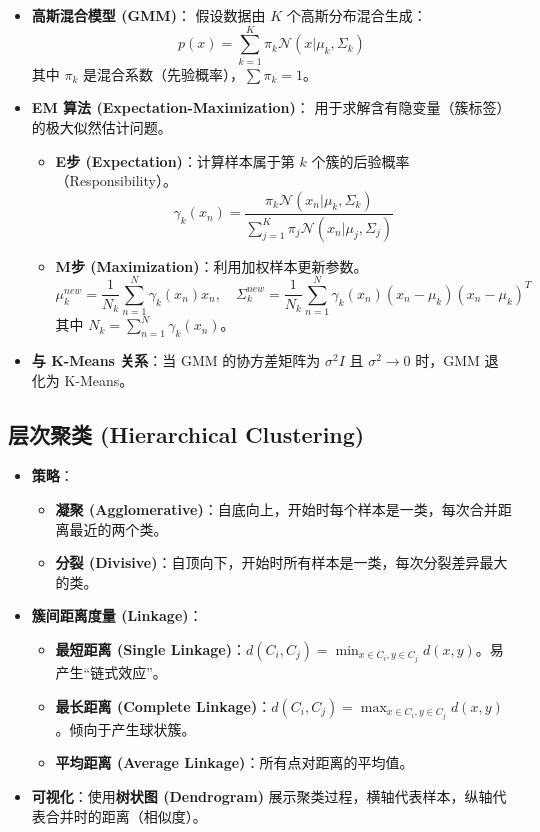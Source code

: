 \documentclass[a4paper, 11pt]{ctexart}
\begin{document}
\begin{itemize}
    \item \textbf{高斯混合模型 (GMM)}：
    假设数据由 $K$ 个高斯分布混合生成：
    \begin{equation}
        p(x) = \sum_{k=1}^K \pi_k \mathcal{N}(x | \mu_k, \Sigma_k)
    \end{equation}
    其中 $\pi_k$ 是混合系数（先验概率），$\sum \pi_k = 1$。
    \item \textbf{EM 算法 (Expectation-Maximization)}：
    用于求解含有隐变量（簇标签）的极大似然估计问题。
    \begin{itemize}
        \item \textbf{E步 (Expectation)}：计算样本属于第 $k$ 个簇的后验概率（Responsibility）。
        \begin{equation}
            \gamma_k(x_n) = \frac{\pi_k \mathcal{N}(x_n | \mu_k, \Sigma_k)}{\sum_{j=1}^K \pi_j \mathcal{N}(x_n | \mu_j, \Sigma_j)}
        \end{equation}
        \item \textbf{M步 (Maximization)}：利用加权样本更新参数。
        \[ \mu_k^{new} = \frac{1}{N_k} \sum_{n=1}^N \gamma_k(x_n) x_n, \quad \Sigma_k^{new} = \frac{1}{N_k} \sum_{n=1}^N \gamma_k(x_n)(x_n - \mu_k)(x_n - \mu_k)^T \]
        其中 $N_k = \sum_{n=1}^N \gamma_k(x_n)$。
    \end{itemize}
    \item \textbf{与 K-Means 关系}：当 GMM 的协方差矩阵为 $\sigma^2 I$ 且 $\sigma^2 \to 0$ 时，GMM 退化为 K-Means。
\end{itemize}

\subsection{层次聚类 (Hierarchical Clustering)}
\begin{itemize}
    \item \textbf{策略}：
    \begin{itemize}
        \item \textbf{凝聚 (Agglomerative)}：自底向上，开始时每个样本是一类，每次合并距离最近的两个类。
        \item \textbf{分裂 (Divisive)}：自顶向下，开始时所有样本是一类，每次分裂差异最大的类。
    \end{itemize}
    \item \textbf{簇间距离度量 (Linkage)}：
    \begin{itemize}
        \item \textbf{最短距离 (Single Linkage)}：$d(C_i, C_j) = \min_{x \in C_i, y \in C_j} d(x, y)$。易产生“链式效应”。
        \item \textbf{最长距离 (Complete Linkage)}：$d(C_i, C_j) = \max_{x \in C_i, y \in C_j} d(x, y)$。倾向于产生球状簇。
        \item \textbf{平均距离 (Average Linkage)}：所有点对距离的平均值。
    \end{itemize}
    \item \textbf{可视化}：使用\textbf{树状图 (Dendrogram)} 展示聚类过程，横轴代表样本，纵轴代表合并时的距离（相似度）。
\end{itemize}
\end{document}
